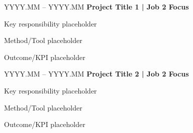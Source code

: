 \begin{twocolentry}{YYYY.MM -- YYYY.MM}
  \textbf{Project Title 1 | Job 2 Focus}
\end{twocolentry}
\begin{onecolentry}
  \begin{highlights}
    \item Key responsibility placeholder
    \item Method/Tool placeholder
    \item Outcome/KPI placeholder
  \end{highlights}
\end{onecolentry}

\entrysep

\begin{twocolentry}{YYYY.MM -- YYYY.MM}
  \textbf{Project Title 2 | Job 2 Focus}
\end{twocolentry}
\begin{onecolentry}
  \begin{highlights}
    \item Key responsibility placeholder
    \item Method/Tool placeholder
    \item Outcome/KPI placeholder
  \end{highlights}
\end{onecolentry}
